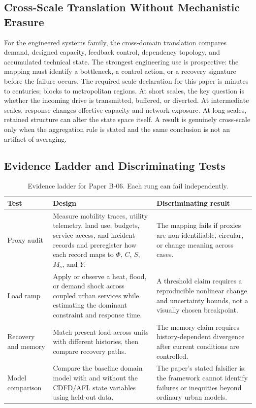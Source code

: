 \documentclass[11pt,a4paper]{article}
\begin{document}
\subsection{Cross-Scale Translation Without Mechanistic Erasure}

For the engineered systems family, the cross-domain translation compares demand, designed capacity, feedback control, dependency topology, and accumulated technical state. The strongest engineering use is prospective: the mapping must identify a bottleneck, a control action, or a recovery signature before the failure occurs. \cite{BarabasiAlbert1999,WattsStrogatz1998,Shannon1948,BakTangWiesenfeld1987}
The required scale declaration for this paper is minutes to centuries; blocks to metropolitan regions. At short
scales, the key question is whether the incoming drive is transmitted,
buffered, or diverted. At intermediate scales, response changes effective
capacity and network exposure. At long scales, retained structure can alter the
state space itself. A result is genuinely cross-scale only when the aggregation
rule is stated and the same conclusion is not an artifact of averaging.

\subsection{Evidence Ladder and Discriminating Tests}

\begin{table}[htbp]
\centering
\small
\caption{Evidence ladder for Paper B-06. Each rung can fail independently.}
\begin{tabularx}{\textwidth}{|p{}|X|X|}
\hline
\textbf{Test} & \textbf{Design} & \textbf{Discriminating result} \\
\hline
Proxy audit & Measure mobility traces, utility telemetry, land use, budgets, service access, and incident records and preregister how each record maps to $\Phi$, $C$, $S$, $M_s$, and $Y$. & The mapping fails if proxies are non-identifiable, circular, or change meaning across cases. \\
\hline
Load ramp & Apply or observe a heat, flood, or demand shock across coupled urban services while estimating the dominant constraint and response time. & A threshold claim requires a reproducible nonlinear change and uncertainty bounds, not a visually chosen breakpoint. \\
\hline
Recovery and memory & Match present load across units with different histories, then compare recovery paths. & The memory claim requires history-dependent divergence after current conditions are controlled. \\
\hline
Model comparison & Compare the baseline domain model with and without the CDFD/AFL state variables using held-out data. & The paper's stated falsifier is: the framework cannot identify failures or inequities beyond ordinary urban models. \\
\hline
\end{tabularx}
\end{table}
\end{document}
